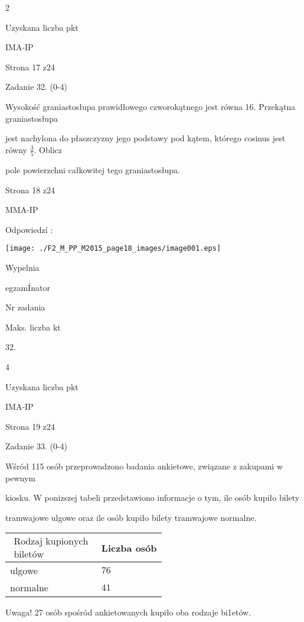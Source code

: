 \documentclass[a4paper,12pt]{article}
\begin{document}
2

Uzyskana liczba pkt

IMA-IP

Strona 17 z24





Zadanie 32. (0-4)

Wysokość graniastosłupa prawidłowego czworokątnego jest równa 16. Przekątna graniastosłupa

jest nachylona do płaszczyzny jego podstawy pod kątem, którego cosinus jest równy $\displaystyle \frac{3}{5}$. Oblicz

pole powierzchni całkowitej tego graniastosłupa.

Strona 18 z24

MMA-IP





Odpowiedzí :
\begin{center}
\texttt{[image: ./F2\_M\_PP\_M2015\_page18\_images/image001.eps]}
\end{center}
Wypelnia

egzamÍnator

Nr zadania

Maks. liczba kt

32.

4

Uzyskana liczba pkt

IMA-IP

Strona 19 z24





Zadanie 33. (0-4)

Wśród 115 osób przeprowadzono badania ankietowe, związane z zakupami w pewnym

kiosku. W ponizszej tabeli przedstawiono informacje o tym, ile osób kupiło bilety

tramwajowe ulgowe oraz ile osób kupiło bilety tramwajowe normalne.
\begin{center}
\begin{tabular}{|l|l|}
\hline
\multicolumn{1}{|l|}{$\begin{array}{l}\mbox{Rodzaj kupionych}	\\	\mbox{biletów}	\end{array}$}&	\multicolumn{1}{|l|}{Liczba osób}	\\
\hline
\multicolumn{1}{|l|}{ulgowe}&	\multicolumn{1}{|l|}{$76$}	\\
\hline
\multicolumn{1}{|l|}{normalne}&	\multicolumn{1}{|l|}{$41$}	\\
\hline
\end{tabular}

\end{center}
Uwaga! 27 osób spośród ankietowanych kupiło oba rodzaje bi1etów.
\end{document}
